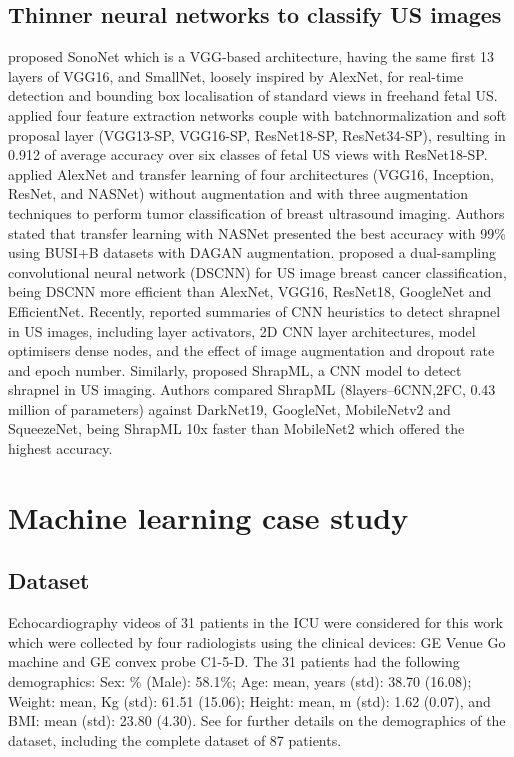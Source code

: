 \documentclass[mlabstract,twocolumn]{jmlr}
\begin{document}
\subsection{Thinner neural networks to classify US images} \label{subsec:thinnerNets}
\citet{baumgartner2017-IEEETransMedImag} proposed SonoNet which is a VGG-based architecture, having the same first 13 layers of VGG16, and SmallNet, loosely inspired by AlexNet, for real-time detection and bounding box localisation of standard views in freehand fetal US.
\citet{toussaint2018-MICCAI} applied four feature extraction networks couple with batchnormalization and soft proposal layer (VGG13-SP, VGG16-SP, ResNet18-SP, ResNet34-SP), resulting in 0.912 of average accuracy over six classes of fetal US views with ResNet18-SP.
\citet{Al-Dhabyani2019-IJACSA} applied AlexNet and transfer learning of four architectures (VGG16, Inception, ResNet, and NASNet) without augmentation and with three augmentation techniques to perform tumor classification of breast ultrasound imaging.
Authors stated that transfer learning with NASNet presented the best accuracy with 99\% using BUSI+B datasets with DAGAN augmentation.
\citet{xie2020-physics-in-medicine-biology} proposed a dual-sampling convolutional neural network (DSCNN) for US image breast cancer classification, being DSCNN more efficient than AlexNet, VGG16, ResNet18, GoogleNet and EfficientNet.
Recently, \citet{snider2022-ScientificReports} reported summaries of CNN heuristics to detect shrapnel in US images, including layer activators, 2D CNN layer architectures, model optimisers dense nodes, and the effect of image augmentation and dropout rate and epoch number.
Similarly, \citet{boice2022-in-jimaging} proposed ShrapML, a CNN model to detect shrapnel in US imaging.
Authors compared ShrapML (8layers--6CNN,2FC, 0.43 million of parameters) against DarkNet19, GoogleNet, MobileNetv2 and SqueezeNet, being ShrapML 10x faster than MobileNet2 which offered the highest accuracy.

\section{Machine learning case study}

\subsection{Dataset}
Echocardiography videos of 31 patients in the ICU were considered for this work which were collected by four radiologists using the clinical devices: GE Venue Go machine and GE convex probe C1-5-D.
The 31 patients had the following demographics:
Sex: \% (Male): 58.1\%;
Age: mean, years (std): 38.70 (16.08);
Weight: mean, Kg (std): 61.51 (15.06);
Height: mean, m (std): 1.62 (0.07), and 
BMI: mean (std): 23.80 (4.30).
See  for further details on the demographics of the dataset, including the complete dataset of 87 patients.
\end{document}
